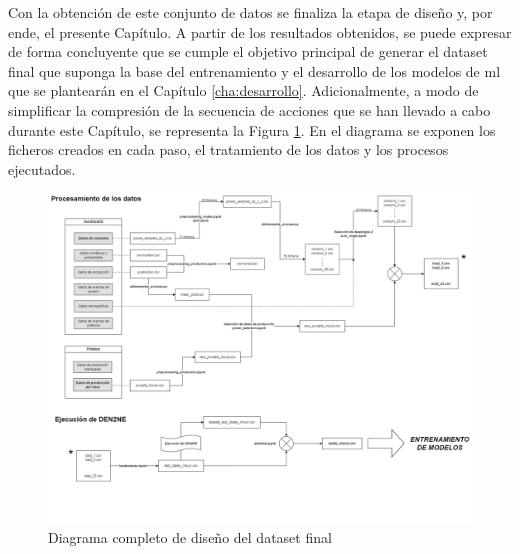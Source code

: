 Con la obtención de este conjunto de datos se finaliza la etapa de diseño y, por ende, el presente Capítulo. A partir de los resultados obtenidos, se puede expresar de forma concluyente que se cumple el objetivo principal de generar el dataset final que suponga la base del entrenamiento y el desarrollo de los modelos de \gls{ml} que se plantearán en el Capítulo \ref{cha:desarrollo}. Adicionalmente, a modo de simplificar la compresión de la secuencia de acciones que se han llevado a cabo durante este Capítulo, se representa la Figura \ref{fig:total}. En el diagrama se exponen los ficheros creados en cada paso, el tratamiento de los datos y los procesos ejecutados.
  
\pagebreak

\begin{figure}
    \centering
    \includegraphics[width=1\textwidth]{img/diseno/total.png} 
    \caption{Diagrama completo de diseño del dataset final}
    \label{fig:total}
\end{figure}

